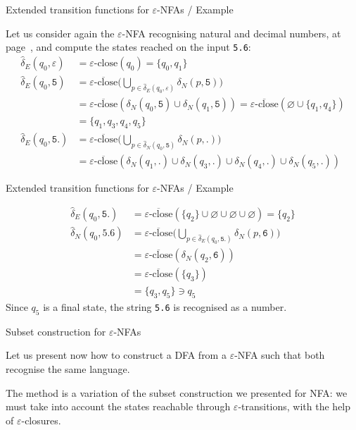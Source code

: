 \documentclass[compress,dvips,xcolor={dvipsnames},t]{beamer}
\newcommand\eNFA{\(\varepsilon\)-NFA\xspace}
\newcommand\eClose{\varepsilon\text{-close}}
\newcommand\eCloseSet{\overline{\eClose}}
\begin{document}
%
\begin{frame}[fragile]{Extended transition functions for {\eNFA}s / Example}

Let us consider again the \eNFA recognising natural and decimal
numbers, at page~\pageref{enfa_num}, and compute the states reached on
the input \verb+5.6+:
\begin{align*}
   \hat{\delta}_E (q_0, \varepsilon)
&= \eClose (q_0) = \{q_0, q_1\}\\
   \hat{\delta}_E (q_0, \mathtt{5})
&= \eCloseSet \Biggl( \bigcup_{p \in \hat{\delta}_E (q_0,
   \varepsilon)}{\delta_N (p, \mathtt{5})} \Biggr)\\
&= \eCloseSet (\delta_N (q_0, \mathtt{5}) \cup \delta_N (q_1,
   \mathtt{5})) = \eCloseSet (\varnothing \cup \{q_1, q_4\})\\
&= \{q_1, q_3, q_4, q_5\}\\
   \hat{\delta}_E (q_0, \mathtt{5.})
&= \eCloseSet \Biggl( \bigcup_{p \in \hat{\delta}_N (q_0,
   \mathtt{5})}{\delta_N (p, \mathtt{.})} \Biggr)\\
&= \eCloseSet (\delta_N (q_1, \mathtt{.}) \cup \delta_N (q_3,
   \mathtt{.}) \cup \delta_N (q_4, \mathtt{.}) \cup \delta_N (q_5,
   \mathtt{.}))
\end{align*}

\end{frame}

%
\begin{frame}[fragile]{Extended transition functions for {\eNFA}s / Example}

\begin{align*}
   \hat{\delta}_E (q_0, \mathtt{5.})
&= \eCloseSet (\{q_2\} \cup \varnothing \cup \varnothing \cup
   \varnothing)
 = \{q_2\}\\
   \hat{\delta}_N (q_0, \mathtt{5.6})
&= \eCloseSet \Biggl( \bigcup_{p \in \hat{\delta}_E (q_0,
     \mathtt{5.})}{\delta_N (p, \mathtt{6})} \Biggr)\\
&= \eCloseSet (\delta_N (q_2, \mathtt{6}))\\
&= \eCloseSet (\{q_3\})\\
&= \{q_3, q_5\} \ni q_5
\end{align*}
Since \(q_5\) is a final state, the string \verb+5.6+ is recognised as
a number.

\end{frame}

%
\begin{frame}{Subset construction for {\eNFA}s}

Let us present now how to construct a DFA from a \eNFA such that both
recognise the same language.

\bigskip

The method is a variation of the subset construction we presented for
NFA: we must take into account the states reachable through
\(\varepsilon\)-transitions, with the help of
\(\varepsilon\)-closures.

\end{frame}
\end{document}
